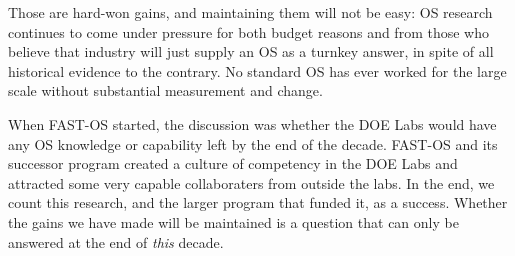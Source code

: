 \documentclass{report}
\begin{document}
Those are hard-won gains, and maintaining them 
will not be easy: OS research continues to come under 
pressure for both budget reasons and 
from those who believe that industry will just supply an OS as a turnkey 
answer, in spite of all historical evidence to the contrary. No standard OS has ever worked
for the large scale without substantial measurement and change. 

When FAST-OS started, the discussion was whether the DOE Labs would have any OS 
knowledge or capability left by the end of the decade. FAST-OS and its successor
program created a culture of competency in the DOE Labs and attracted some very 
capable collaboraters from outside the labs. 
In the end, we count this research, 
and the larger program that funded it, as a success. Whether
the gains we have made will be maintained is a question that can only 
be answered at the end of {\em this} decade. 




\end{document}
